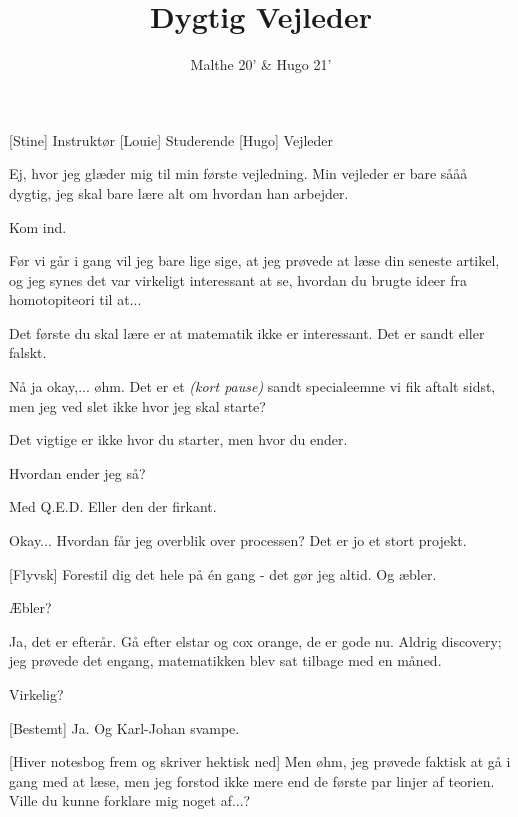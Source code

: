 \documentclass[a4paper,11pt]{article}
\title{Dygtig Vejleder}
\author{Malthe 20' \& Hugo 21'}
\begin{document}
\maketitle

\begin{roles}
[Stine] Instruktør
[Louie] Studerende
[Hugo] Vejleder
\end{roles}

\begin{sketch}

 Ej, hvor jeg glæder mig til min første vejledning. Min vejleder er bare sååå dygtig, jeg skal bare lære alt om hvordan han arbejder.


 Kom ind. 


 Før vi går i gang vil jeg bare lige sige, at jeg prøvede at læse din seneste artikel, og jeg synes det var virkeligt interessant at se, hvordan du brugte ideer fra homotopiteori til at...


 Det første du skal lære er at matematik ikke er interessant. Det er sandt eller falskt.

 Nå ja okay,... øhm. Det er et \emph{(kort pause)} sandt specialeemne vi fik aftalt sidst, men jeg ved slet ikke hvor jeg skal starte?

 Det vigtige er ikke hvor du starter, men hvor du ender.

 Hvordan ender jeg så? 

 Med Q.E.D. Eller den der firkant.

 Okay... Hvordan får jeg overblik over processen? Det er jo et stort projekt. 

[Flyvsk] Forestil dig det hele på én gang - det gør jeg altid. Og æbler.

 Æbler?

 Ja, det er efterår. Gå efter elstar og cox orange, de er gode nu. Aldrig discovery; jeg prøvede det engang, matematikken blev sat tilbage med en måned.

 Virkelig?

[Bestemt] Ja. Og Karl-Johan svampe.

[Hiver notesbog frem og skriver hektisk ned] Men øhm, jeg prøvede faktisk at gå i gang med at læse, men jeg forstod ikke mere end de første par linjer af teorien. Ville du kunne forklare mig noget af...?


\end{sketch}
\end{document}
